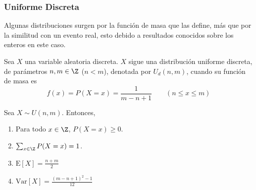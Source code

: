 \subsubsection{Uniforme Discreta}
Algunas distribuciones surgen por la función de masa que las define, más que
por la similitud con un evento real, esto debido a resultados conocidos
sobre los enteros en este caso.

\begin{Def}
  Sea $X$ una variable aleatoria discreta. $X$ sigue una distribución uniforme
  discreta, de parámetros $n,m\in\Z$ ($n < m$), denotada por $U_d(n,m)$,
  cuando su función de masa es
  \[f(x) = P(X=x) = \frac{1}{m-n+1}\qquad (n\leq x\leq m)\]
\end{Def}
\begin{Teo}
  Sea $X\sim U(n,m)$. Entonces,
  \begin{enumerate}
    \item Para todo $x\in\Z$, $P(X=x)\geq0$.
    \item $\sum_{x\in\Z}P(X=x) = 1$.
    \item $\text{E}[X] = \frac{n+m}{2}$
    \item $\text{Var}[X] = \frac{(m-n+1)^2-1}{12}$
  \end{enumerate}
\end{Teo}
